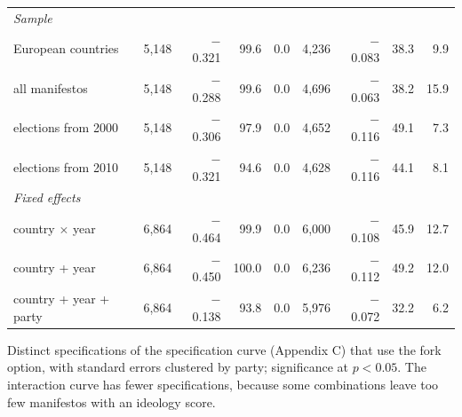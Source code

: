\begin{table}[ht]
{\begin{tabular}{lrrrrrrrr}
\multicolumn{9}{l}{\emph{Sample}} \\
\quad European countries & 5,148 & $-$0.321 & 99.6 & 0.0 & 4,236 & $-$0.083 & 38.3 & 9.9 \\
\quad all manifestos & 5,148 & $-$0.288 & 99.6 & 0.0 & 4,696 & $-$0.063 & 38.2 & 15.9 \\
\quad elections from 2000 & 5,148 & $-$0.306 & 97.9 & 0.0 & 4,652 & $-$0.116 & 49.1 & 7.3 \\
\quad elections from 2010 & 5,148 & $-$0.321 & 94.6 & 0.0 & 4,628 & $-$0.116 & 44.1 & 8.1 \\
\multicolumn{9}{l}{\emph{Fixed effects}} \\
\quad country $\times$ year & 6,864 & $-$0.464 & 99.9 & 0.0 & 6,000 & $-$0.108 & 45.9 & 12.7 \\
\quad country + year & 6,864 & $-$0.450 & 100.0 & 0.0 & 6,236 & $-$0.112 & 49.2 & 12.0 \\
\quad country + year + party & 6,864 & $-$0.138 & 93.8 & 0.0 & 5,976 & $-$0.072 & 32.2 & 6.2 \\
\bottomrule
\end{tabular}}
\par\smallskip
\begin{minipage}{\linewidth}\scriptsize Distinct specifications of the specification curve (Appendix C) that use the fork option, with standard errors clustered by party; significance at $p<0.05$. The interaction curve has fewer specifications, because some combinations leave too few manifestos with an ideology score.\end{minipage}
\end{table}
